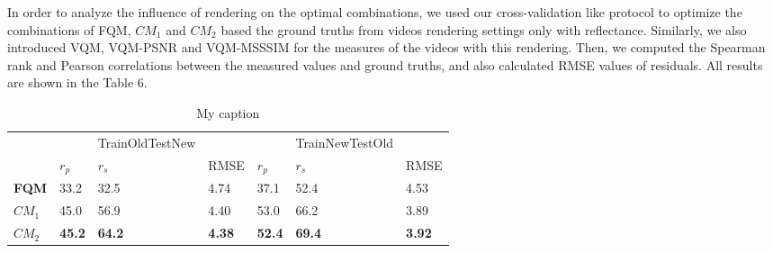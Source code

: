 In order to analyze the influence of rendering on the optimal combinations, we used our cross-validation like protocol to optimize the combinations of FQM, $CM_1$ and $CM_2$ based the ground truths from videos rendering settings only with reflectance. Similarly, we also introduced VQM, VQM-PSNR and VQM-MSSSIM for the measures of the videos with this rendering. Then, we computed the Spearman rank and Pearson correlations between the measured values and ground truths, and also calculated RMSE values of residuals. All results are shown in the Table 6.\\
\begin{table}[]
\centering
\caption{My caption}
\label{my-label}
\begin{tabular}{lllllll}
             &               & TrainOldTestNew &               &               & TrainNewTestOld &               \\
             & $r_p$                & $r_s$             & RMSE          & $r_p$                & $r_s$               & RMSE          \\
\textbf{FQM} & 33.2          & 32.5           & 4.74          & 37.1         & 52.4            & 4.53          \\
\textbf{$CM_1$} & 45.0         & 56.9            & 4.40          & 53.0          & 66.2            & 3.89          \\
\textbf{$CM_2$} & \textbf{45.2} & \textbf{64.2}   & \textbf{4.38} & \textbf{52.4} & \textbf{69.4}   & \textbf{3.92}
\end{tabular}
\end{table}